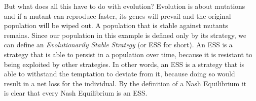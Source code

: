 \documentclass{article}
\begin{document}
	But what does all this have to do with evolution? Evolution is about mutations and if a mutant can reproduce faster, its genes will prevail and the original population will be wiped out. A population that is stable against mutants remains. Since our population in this example is defined only by its strategy, we can define an \textit{Evolutionarily Stable Strategy} (or ESS for short). An ESS is a strategy that is able to persist in a population over time, because it is resistant to being exploited by other strategies. In other words, an ESS is a strategy that is able to withstand the temptation to deviate from it, because doing so would result in a net loss for the individual. By the definition of a Nash Equilibrium it is clear that every Nash Equilibrium is an ESS.
\end{document}
